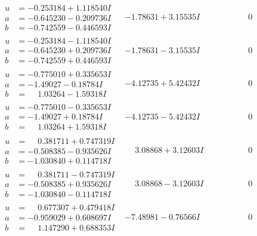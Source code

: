 \documentclass[1p]{elsarticle_modified}
\theoremstyle{definition}
\begin{document}
$$\begin{array}{c|c|c}
\begin{aligned}
u &= -0.253184 + 1.118540 I \\
a &= -0.645230 - 0.209736 I \\
b &= -0.742559 - 0.446593 I\end{aligned}
 & -1.78631 + 3.15535 I & \phantom{-0.000000 } 0 \\ \hline\begin{aligned}
u &= -0.253184 - 1.118540 I \\
a &= -0.645230 + 0.209736 I \\
b &= -0.742559 + 0.446593 I\end{aligned}
 & -1.78631 - 3.15535 I & \phantom{-0.000000 } 0 \\ \hline\begin{aligned}
u &= -0.775010 + 0.335653 I \\
a &= -1.49027 - 0.18784 I \\
b &= \phantom{-}1.03264 - 1.59318 I\end{aligned}
 & -4.12735 + 5.42432 I & \phantom{-0.000000 } 0 \\ \hline\begin{aligned}
u &= -0.775010 - 0.335653 I \\
a &= -1.49027 + 0.18784 I \\
b &= \phantom{-}1.03264 + 1.59318 I\end{aligned}
 & -4.12735 - 5.42432 I & \phantom{-0.000000 } 0 \\ \hline\begin{aligned}
u &= \phantom{-}0.381711 + 0.747319 I \\
a &= -0.508385 - 0.935626 I \\
b &= -1.030840 + 0.114718 I\end{aligned}
 & \phantom{-}3.08868 + 3.12603 I & \phantom{-0.000000 } 0 \\ \hline\begin{aligned}
u &= \phantom{-}0.381711 - 0.747319 I \\
a &= -0.508385 + 0.935626 I \\
b &= -1.030840 - 0.114718 I\end{aligned}
 & \phantom{-}3.08868 - 3.12603 I & \phantom{-0.000000 } 0 \\ \hline\begin{aligned}
u &= \phantom{-}0.677307 + 0.479418 I \\
a &= -0.959029 + 0.608697 I \\
b &= \phantom{-}1.147290 + 0.688353 I\end{aligned}
 & -7.48981 - 0.76566 I & \phantom{-0.000000 } 0\\

\end{array}$$
\end{document}
